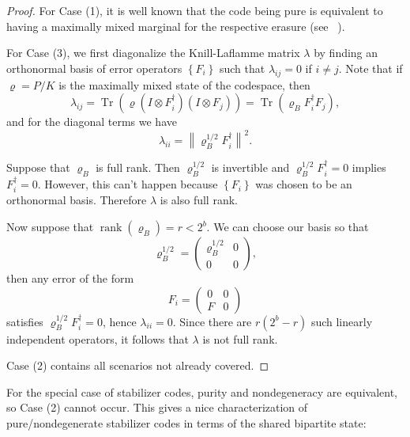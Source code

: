 \documentclass[]{amsart}
\DeclareMathOperator{\Tr}{Tr}
\DeclareMathOperator{\rank}{rank}
\newcommand{\norm}[1]{\left\lVert#1\right\rVert}
\begin{document}
\begin{proof}

For Case (1), it is well known that the code being pure is equivalent to having a maximally mixed marginal for the respective erasure (see ~\cite{GHW2022}).

For Case (3), we first diagonalize the Knill-Laflamme matrix $\lambda$ by finding an orthonormal basis of error operators $\left\{F_i\right\}$ such that $\lambda_{ij}=0$ if $i\neq j$.
Note that if $\varrho=P/K$ is the maximally mixed state of the codespace, then
\begin{equation}
    \lambda_{ij}=\Tr\!\left(\varrho \left(I\otimes F_i^\dagger\right)\left(I\otimes F_j\right)\right)=\Tr\!\left(\varrho_B F_i^\dagger F_j\right),
\end{equation}
and for the diagonal terms we have
\begin{equation}
    \lambda_{ii}=\norm{\varrho_B^{1/2}F_i^\dagger}^2.
\end{equation}

Suppose that $\varrho_B$ is full rank.
Then $\varrho_B^{1/2}$ is invertible and $\varrho_B^{1/2}F_i^\dagger=0$ implies $F_i^\dagger=0$.
However, this can't happen because $\left\{F_i\right\}$ was chosen to be an orthonormal basis.
Therefore $\lambda$ is also full rank.

Now suppose that $\rank\!\left(\varrho_B\right)=r<2^b$.
We can choose our basis so that
\begin{equation}
    \varrho_B^{1/2}=\begin{pmatrix}
        \varrho_B^{1/2} & 0 \\
        0 & 0
    \end{pmatrix},
\end{equation}
then any error of the form
\begin{equation}
    F_i=\begin{pmatrix}
        0 & 0 \\
        F & 0
    \end{pmatrix}
\end{equation}
satisfies $\varrho_B^{1/2}F_i^\dagger=0$, hence $\lambda_{ii}=0$. Since there are $r\left(2^b-r\right)$ such linearly independent operators, it follows that $\lambda$ is not full rank.

Case (2) contains all scenarios not already covered.
\end{proof}

For the special case of stabilizer codes, purity and nondegeneracy are equivalent, so Case (2) cannot occur.
This gives a nice characterization of pure/nondegenerate stabilizer codes in terms of the shared bipartite state:
\end{document}

